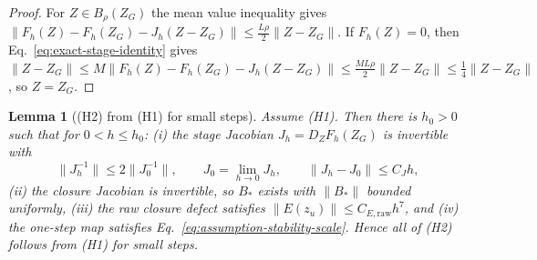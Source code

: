 \documentclass[preprint,12pt]{elsarticle}
\newtheorem{lemma}{Lemma}
\begin{document}
\begin{proof}
For $Z\in B_\rho(Z_G)$ the mean value inequality gives
$\|F_h(Z)-F_h(Z_G)-J_h(Z-Z_G)\|\le\tfrac{L\rho}{2}\|Z-Z_G\|$. If $F_h(Z)=0$, then
Eq.~\eqref{eq:exact-stage-identity} gives
$\|Z-Z_G\|\le M\|F_h(Z)-F_h(Z_G)-J_h(Z-Z_G)\|\le\tfrac{ML\rho}{2}\|Z-Z_G\|\le\tfrac14\|Z-Z_G\|$,
so $Z=Z_G$.
\end{proof}

\begin{lemma}[(H2) from (H1) for small steps]
\label{lem:p2-from-p1}
Assume (H1). Then there is $h_0>0$ such that for $0<h\le h_0$: (i) the stage Jacobian
$J_h=D_ZF_h(Z_G)$ is invertible with
\begin{equation}
  \|J_h^{-1}\|\le 2\|J_0^{-1}\|,\qquad J_0=\lim_{h\to0}J_h,\qquad \|J_h-J_0\|\le C_Jh ,
  \label{eq:p2-perturbation-bound}
\end{equation}
(ii) the closure Jacobian is invertible, so $B_\ast$ exists with $\|B_\ast\|$ bounded uniformly,
(iii) the raw closure defect satisfies $\|E(z_u)\|\le C_{E,\mathrm{raw}}h^7$, and (iv) the one-step
map satisfies Eq.~\eqref{eq:assumption-stability-scale}. Hence all of (H2) follows from (H1) for
small steps.
\end{lemma}
\end{document}
